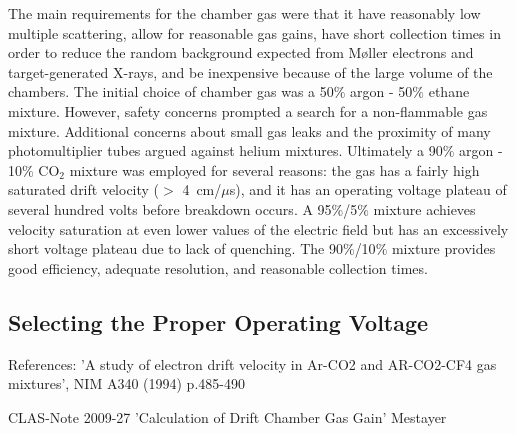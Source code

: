 The main requirements for the chamber gas were that it have reasonably low 
multiple scattering, allow for reasonable gas gains, have short collection 
times in order to reduce the random background expected from M{\o}ller 
electrons and target-generated X-rays, and be inexpensive because of the 
large volume of the chambers.  The initial choice of chamber gas was a
50$\%$ argon - 50$\%$ ethane mixture.  However, safety concerns prompted a 
search for a non-flammable gas mixture.  Additional concerns about small gas 
leaks and the proximity of many photomultiplier tubes argued against helium 
mixtures.  Ultimately a 90$\%$ argon - 10$\%$ CO$_2$ mixture was employed 
for several reasons: the gas has a fairly high saturated drift velocity 
($>$ 4~cm/$\mu$s), and it has an operating voltage plateau of several hundred 
volts before breakdown occurs.  A 95$\%$/5$\%$ mixture achieves velocity 
saturation at even lower values of the electric field but has an excessively 
short voltage plateau due to lack of quenching.  The 90$\%$/10$\%$ mixture 
provides good efficiency, adequate resolution, and reasonable collection times.



\subsection{Selecting the Proper Operating Voltage}
\hskip 0.15in



References: 'A study of electron drift velocity in Ar-CO2 and AR-CO2-CF4 gas
mixtures', NIM A340 (1994) p.485-490

CLAS-Note 2009-27 'Calculation of Drift Chamber Gas Gain' Mestayer
